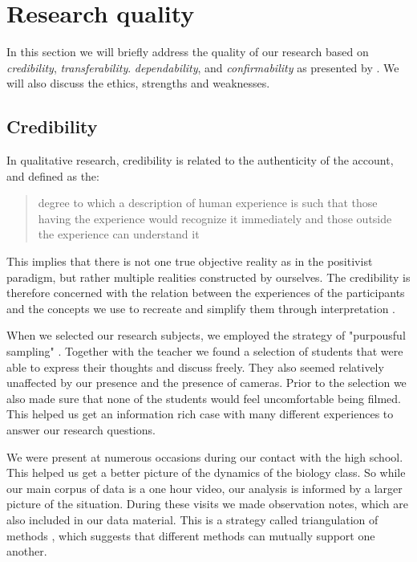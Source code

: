 \section{Research quality}
In this section we will briefly address the quality of our research based on \emph{credibility}, \emph{transferability}. \emph{dependability}, and \emph{confirmability} as presented by \citet{baxter1997evaluating}. We will also discuss the ethics, strengths and weaknesses. 

\subsection{Credibility}
In qualitative research, credibility is related to the authenticity of the account, and defined as the: \begin{quote}degree to which a description of human experience is such that those having the experience would recognize it immediately and those outside the experience can understand it \citetext{\citealp{lincoln1985naturalistic}, referenced in \citealp{baxter1997evaluating}}\end{quote}

This implies that there is not one true objective reality as in the positivist paradigm, but rather multiple realities constructed by ourselves. The credibility is therefore concerned with the relation between the experiences of the participants and the concepts we use to recreate and simplify them through interpretation \citep{baxter1997evaluating}.

When we selected our research subjects, we employed the strategy of "purpousful sampling" \citep{baxter1997evaluating}. Together with the teacher we found a selection of students that were able to express their thoughts and discuss freely. They also seemed relatively unaffected by our presence and the presence of cameras. Prior to the selection we also made sure that none of the students would feel uncomfortable being filmed. This helped us get an information rich case with many different experiences to answer our research questions. 

We were present at numerous occasions during our contact with the high school. This helped us get a better picture of the dynamics of the biology class. So while our main corpus of data is a one hour video, our analysis is informed by a larger picture of the situation. During these visits we made observation notes, which are also included in our data material. This is a strategy called triangulation of methods \citep{baxter1997evaluating}, which suggests that different methods can mutually support one another. 

